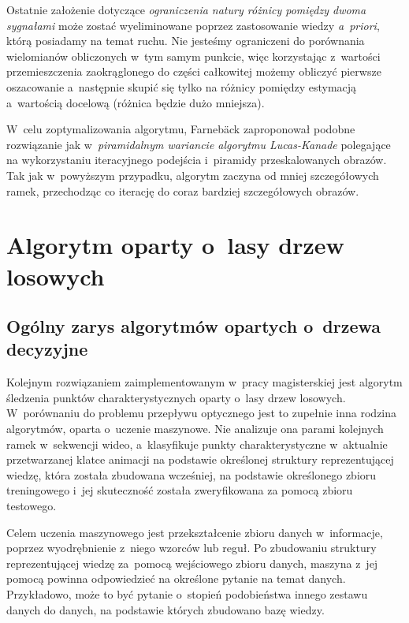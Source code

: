     Ostatnie założenie dotyczące \textit{ograniczenia natury różnicy pomiędzy dwoma sygnałami} może zostać wyeliminowane poprzez zastosowanie wiedzy \textit{a~priori}, którą posiadamy na temat ruchu. Nie jesteśmy ograniczeni do porównania wielomianów obliczonych w~tym samym punkcie, więc korzystając z~wartości przemieszczenia zaokrąglonego do części całkowitej możemy obliczyć pierwsze oszacowanie a~następnie skupić się tylko na różnicy pomiędzy estymacją a~wartością docelową (różnica będzie dużo mniejsza).

    W~celu zoptymalizowania algorytmu, Farnebäck zaproponował podobne rozwiązanie jak w~\textit{piramidalnym wariancie algorytmu Lucas-Kanade} polegające na wykorzystaniu iteracyjnego podejścia i~piramidy przeskalowanych obrazów. Tak jak w~powyższym przypadku, algorytm zaczyna od mniej szczegółowych ramek, przechodząc co iterację do coraz bardziej szczegółowych obrazów.

  \section{Algorytm oparty o~lasy drzew losowych}\label{Subsection_RandomizedTrees}

    \subsection{Ogólny zarys algorytmów opartych o~drzewa decyzyjne}
    Kolejnym rozwiązaniem zaimplementowanym w~pracy magisterskiej jest algorytm śledzenia punktów charakterystycznych oparty o~lasy drzew losowych. W~porównaniu do problemu przepływu optycznego jest to zupełnie inna rodzina algorytmów, oparta o~uczenie maszynowe. Nie analizuje ona parami kolejnych ramek w~sekwencji wideo, a~klasyfikuje punkty charakterystyczne w~aktualnie przetwarzanej klatce animacji na podstawie określonej struktury reprezentującej wiedzę, która została zbudowana wcześniej, na podstawie określonego zbioru treningowego i~jej skuteczność została zweryfikowana za pomocą zbioru testowego.

    Celem uczenia maszynowego jest przekształcenie zbioru danych w~informacje, poprzez wyodrębnienie z~niego wzorców lub reguł. Po zbudowaniu struktury reprezentującej wiedzę za~pomocą wejściowego zbioru danych, maszyna z~jej pomocą powinna odpowiedzieć na określone pytanie na temat danych. Przykładowo, może to być pytanie o~stopień podobieństwa innego zestawu danych do danych, na podstawie których zbudowano bazę wiedzy.

